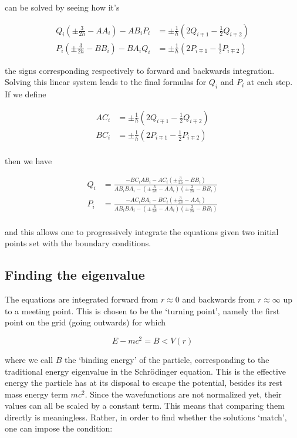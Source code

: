 \documentclass[]{report}
\begin{document}
can be solved by seeing how it's

\begin{align}
Q_i\left(\pm\frac{3}{2h}-AA_i\right) - AB_iP_i&= \pm\frac{1}{h}\left(2Q_{i\mp1}-\frac{1}{2}Q_{i\mp2}\right) \\
P_i\left(\pm\frac{3}{2h}-BB_i\right) - BA_iQ_i&= \pm\frac{1}{h}\left(2P_{i\mp1}-\frac{1}{2}P_{i\mp2}\right)
\end{align}

the signs corresponding respectively to forward and backwards integration. Solving this linear system leads to the final formulas for $Q_i$ and $P_i$ at each step. If we define

\begin{align}
AC_i &= \pm\frac{1}{h}\left(2Q_{i\mp1}-\frac{1}{2}Q_{i\mp2}\right) \\
BC_i &= \pm\frac{1}{h}\left(2P_{i\mp1}-\frac{1}{2}P_{i\mp2}\right) \\
\end{align}

then we have

\begin{align}
Q_i &= \frac{-BC_iAB_i-AC_i(\pm\frac{3}{2h}-BB_i)}{AB_iBA_i-(\pm\frac{3}{2h}-AA_i)(\pm\frac{3}{2h}-BB_i)} \\
P_i &= \frac{-AC_iBA_i-BC_i(\pm\frac{3}{2h}-AA_i)}{AB_iBA_i-(\pm\frac{3}{2h}-AA_i)(\pm\frac{3}{2h}-BB_i)} \\
\end{align}

and this allows one to progressively integrate the equations given two initial points set with the boundary conditions.

\subsection{Finding the eigenvalue}

The equations are integrated forward from $r\approx0$ and backwards from $r\approx\infty$ up to a meeting point. This is chosen to be the `turning point', namely the first point on the grid (going outwards) for which

\begin{equation}
E-mc^2 = B < V(r)
\end{equation}

where we call $B$ the `binding energy' of the particle, corresponding to the traditional energy eigenvalue in the Schr\"{o}dinger equation. This is the effective energy the particle has at its disposal to escape the potential, besides its rest mass energy term $mc^2$.\newline
Since the wavefunctions are not normalized yet, their values can all be scaled by a constant term. This means that comparing them directly is meaningless. Rather, in order to find whether the solutions `match', one can impose the condition:
\end{document}
